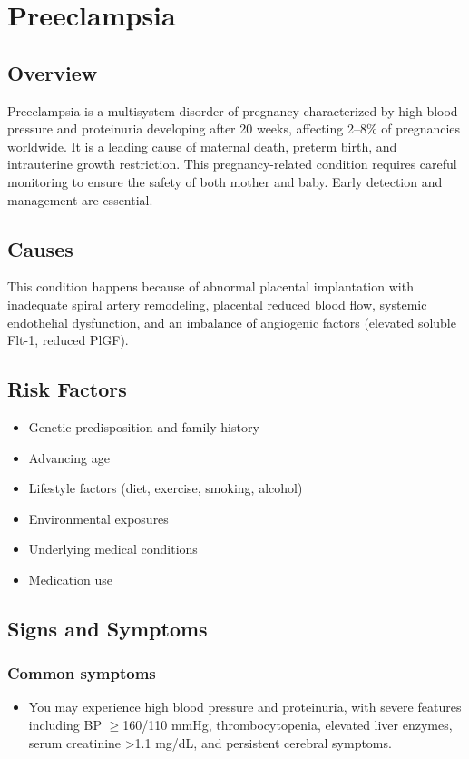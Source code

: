 \chapter{Preeclampsia}
\label{sec:Preeclampsia}

\section{Overview}
Preeclampsia is a multisystem disorder of pregnancy characterized by high blood pressure and proteinuria developing after 20 weeks, affecting 2--8\% of pregnancies worldwide. It is a leading cause of maternal death, preterm birth, and intrauterine growth restriction. This pregnancy-related condition requires careful monitoring to ensure the safety of both mother and baby. Early detection and management are essential.
\section{Causes}
This condition happens because of abnormal placental implantation with inadequate spiral artery remodeling, placental reduced blood flow, systemic endothelial dysfunction, and an imbalance of angiogenic factors (elevated soluble Flt-1, reduced PlGF).     
\section{Risk Factors}

\begin{itemize}[noitemsep]
  \item Genetic predisposition and family history
  \item Advancing age
  \item Lifestyle factors (diet, exercise, smoking, alcohol)
  \item Environmental exposures
  \item Underlying medical conditions
  \item Medication use
\end{itemize}
\section{Signs and Symptoms}

\subsection{Common symptoms}
\begin{itemize}[noitemsep]
  \item You may experience high blood pressure and proteinuria, with severe features including BP $\ge$160/110 mmHg, thrombocytopenia, elevated liver enzymes, serum creatinine >1.1 mg/dL, and persistent cerebral symptoms. 
  \end{itemize}

